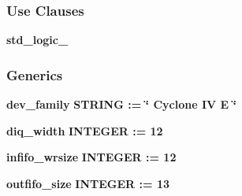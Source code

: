 \subsubsection*{Use Clauses}
 \begin{DoxyCompactItemize}
\item 
{\bf std\+\_\+logic\+\_}   
\end{DoxyCompactItemize}
\subsubsection*{Generics}
 \begin{DoxyCompactItemize}
\item 
{\bf dev\+\_\+family} {\bfseries {\bfseries \textcolor{comment}{S\+T\+R\+I\+NG}\textcolor{vhdlchar}{ }\textcolor{vhdlchar}{ }\textcolor{vhdlchar}{\+:}\textcolor{vhdlchar}{=}\textcolor{vhdlchar}{ }\textcolor{vhdlchar}{ }\textcolor{vhdlchar}{ }\textcolor{vhdlchar}{ }\textcolor{keyword}{\char`\"{} Cyclone I\+V E \char`\"{}}\textcolor{vhdlchar}{ }}}
\item 
{\bf diq\+\_\+width} {\bfseries {\bfseries \textcolor{comment}{I\+N\+T\+E\+G\+ER}\textcolor{vhdlchar}{ }\textcolor{vhdlchar}{ }\textcolor{vhdlchar}{\+:}\textcolor{vhdlchar}{=}\textcolor{vhdlchar}{ }\textcolor{vhdlchar}{ } \textcolor{vhdldigit}{12} \textcolor{vhdlchar}{ }}}
\item 
{\bf infifo\+\_\+wrsize} {\bfseries {\bfseries \textcolor{comment}{I\+N\+T\+E\+G\+ER}\textcolor{vhdlchar}{ }\textcolor{vhdlchar}{ }\textcolor{vhdlchar}{\+:}\textcolor{vhdlchar}{=}\textcolor{vhdlchar}{ }\textcolor{vhdlchar}{ } \textcolor{vhdldigit}{12} \textcolor{vhdlchar}{ }}}
\item 
{\bf outfifo\+\_\+size} {\bfseries {\bfseries \textcolor{comment}{I\+N\+T\+E\+G\+ER}\textcolor{vhdlchar}{ }\textcolor{vhdlchar}{ }\textcolor{vhdlchar}{\+:}\textcolor{vhdlchar}{=}\textcolor{vhdlchar}{ }\textcolor{vhdlchar}{ } \textcolor{vhdldigit}{13} \textcolor{vhdlchar}{ }}}
\end{DoxyCompactItemize}
